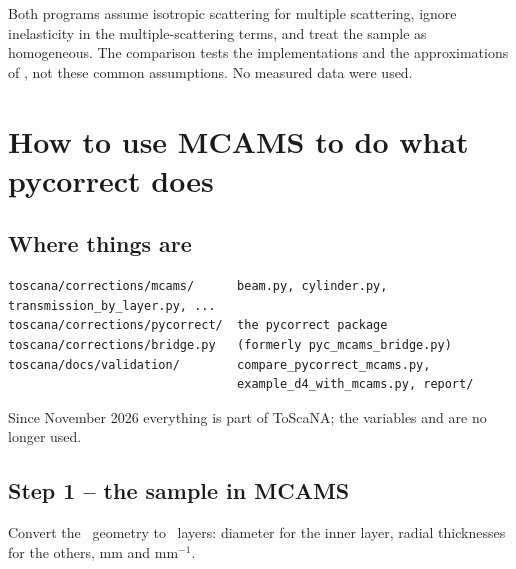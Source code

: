 \documentclass[11pt,a4paper]{report}
\begin{document}
\begin{warn}
Both programs assume isotropic scattering for multiple scattering, ignore
inelasticity in the multiple-scattering terms, and treat the sample as
homogeneous. The comparison tests the implementations and the approximations of
\cor, not these common assumptions. No measured data were used.
\end{warn}

\chapter{How to use MCAMS to do what pycorrect does}
\label{chap:howto}

\section{Where things are}

\begin{lstlisting}[style=shell]
toscana/corrections/mcams/      beam.py, cylinder.py, transmission_by_layer.py, ...
toscana/corrections/pycorrect/  the pycorrect package
toscana/corrections/bridge.py   (formerly pyc_mcams_bridge.py)
toscana/docs/validation/        compare_pycorrect_mcams.py,
                                example_d4_with_mcams.py, report/
\end{lstlisting}
Since November 2026 everything is part of ToScaNA; the variables 
and  are no longer used.

\section{Step 1 -- the sample in MCAMS}

Convert the \pyc\ geometry to \mcams\ layers: diameter for the inner layer, radial
thicknesses for the others, mm and mm$^{-1}$.
\end{document}
